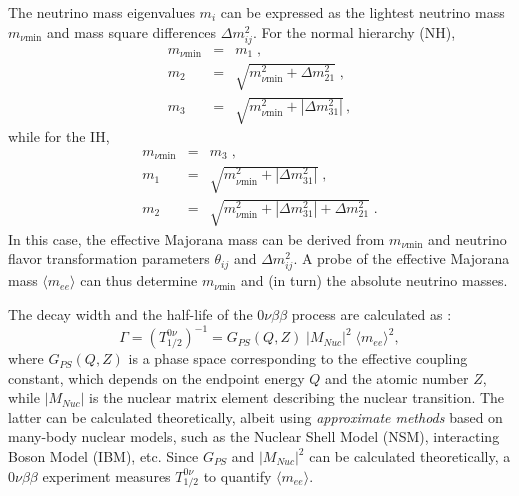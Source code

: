 The neutrino mass eigenvalues $m_i$ can be expressed as the lightest neutrino mass $m_{\nu \mathrm{min}}$ and mass square differences $\Delta m^2_{ij}$\cite{suekane2015neutrino}. For the normal hierarchy (NH),
\begin{eqnarray*}
m_{\nu \mathrm{min}} &=& m_1 \; , \\
m_2 &=& \sqrt{m_{\nu \mathrm{min}}^2+\Delta m^2_{21}} \; , \\
m_3 &=& \sqrt{m_{\nu \mathrm{min}}^2+|\Delta m^2_{31}|} \, ,
\end{eqnarray*}
while for the IH, 
\begin{eqnarray*}
m_{\nu \mathrm{min}} &=& m_3 \; , \\
m_1 &=& \sqrt{m_{\nu \mathrm{min}}^2+|\Delta m^2_{31}|} \; , \\
m_2 &=& \sqrt{m_{\nu \mathrm{min}}^2+|\Delta m^2_{31}|+\Delta m^2_{21}} \; .
\end{eqnarray*}
In this case, the effective Majorana mass can be derived from $m_{\nu \mathrm{min}}$ and neutrino flavor transformation parameters $\theta_{ij}$ and $\Delta m^2_{ij}$. A probe of the effective Majorana mass $\langle m_{ee}\rangle$ can thus determine $m_{\nu \mathrm{min}}$ and (in turn) the absolute neutrino masses. 

The decay width and the half-life of the $0\nu\beta\beta$ process are calculated as \cite{suekane2015neutrino,zuber2020neutrino}:
\begin{equation}\label{eq:decayWidth0vbb}
\Gamma=(T^{0\nu}_{1/2})^{-1} = G_{PS}(Q,Z) \; |M_{Nuc}|^2 \; \langle m_{ee}\rangle^2, 
\end{equation}
where $G_{PS}(Q,Z)$ is a phase space corresponding to the effective coupling constant, which depends on the endpoint energy $Q$ and the atomic number $Z$, while $|M_{Nuc}|$ is the nuclear matrix element describing the nuclear transition. The latter can be calculated theoretically, albeit using {\em approximate methods} based on many-body nuclear models, such as the Nuclear Shell Model (NSM), interacting Boson Model (IBM), etc. Since $G_{PS}$ and $|M_{Nuc}|^2$ can be calculated theoretically, a $0\nu\beta\beta$ experiment measures $T^{0\nu}_{1/2}$ to quantify $\langle m_{ee}\rangle$.

